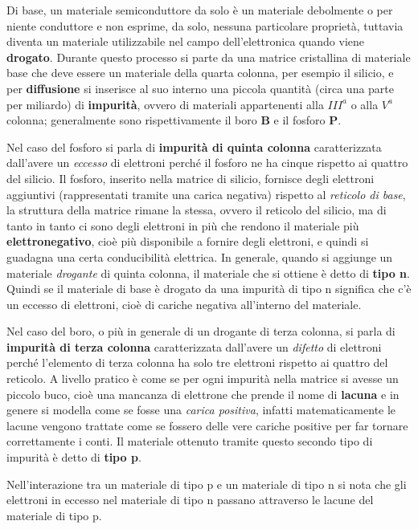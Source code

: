 \documentclass[12pt, a4paper]{report}
\begin{document}
Di base, un materiale semiconduttore da solo è un materiale debolmente o per niente conduttore e non esprime, da solo, nessuna particolare proprietà, tuttavia diventa un materiale utilizzabile nel campo dell'elettronica quando viene \textbf{drogato}. Durante questo processo si parte da una matrice cristallina di materiale base che deve essere un materiale della quarta colonna, per esempio il silicio, e per \textbf{diffusione} si inserisce al suo interno una piccola quantità (circa una parte per miliardo) di \textbf{impurità}, ovvero di materiali appartenenti alla $III^{a}$ o alla $V^{a}$ colonna; generalmente sono rispettivamente il boro \textbf{B} e il fosforo \textbf{P}.

Nel caso del fosforo si parla di \textbf{impurità di quinta colonna} caratterizzata dall'avere un \textit{eccesso} di elettroni perché il fosforo ne ha cinque rispetto ai quattro del silicio. Il fosforo, inserito nella matrice di silicio, fornisce degli elettroni aggiuntivi (rappresentati tramite una carica negativa) rispetto al \textit{reticolo di base}, la struttura della matrice rimane la stessa, ovvero il reticolo del silicio, ma di tanto in tanto ci sono degli elettroni in più che rendono il materiale più \textbf{elettronegativo}, cioè più disponibile a fornire degli elettroni, e quindi si guadagna una certa conducibilità elettrica. In generale, quando si aggiunge un materiale \textit{drogante} di quinta colonna, il materiale che si ottiene è detto di \textbf{tipo n}. Quindi se il materiale di base è drogato da una impurità di tipo n significa che c'è un eccesso di elettroni, cioè di cariche negativa all'interno del materiale.

Nel caso del boro, o più in generale di un drogante di terza colonna, si parla di \textbf{impurità di terza colonna} caratterizzata dall'avere un \textit{difetto} di elettroni perché l'elemento di terza colonna ha solo tre elettroni rispetto ai quattro del reticolo. A livello pratico è come se per ogni impurità nella matrice si avesse un piccolo buco, cioè una mancanza di elettrone che prende il nome di \textbf{lacuna} e in genere si modella come se fosse una \textit{carica positiva}, infatti matematicamente le lacune vengono trattate come se fossero delle vere cariche positive per far tornare correttamente i conti. Il materiale ottenuto tramite questo secondo tipo di impurità è detto di \textbf{tipo p}.

Nell'interazione tra un materiale di tipo p e un materiale di tipo n si nota che gli elettroni in eccesso nel materiale di tipo n passano attraverso le lacune del materiale di tipo p.
\end{document}
